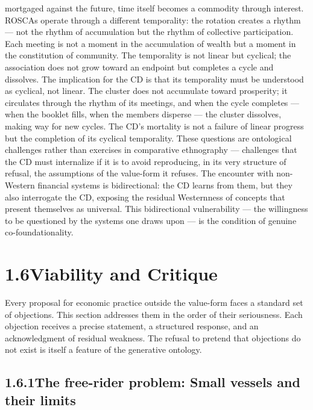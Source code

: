 mortgaged against the future, time itself becomes a commodity through interest. ROSCAs operate through a different temporality: the rotation creates a rhythm — not the rhythm of accumulation but the rhythm of collective participation. Each meeting is not a moment in the accumulation of wealth but a moment in the constitution of community. The temporality is not linear but cyclical; the association does not grow toward an endpoint but completes a cycle and dissolves. The implication for the CD is that its temporality must be understood as cyclical, not linear. The cluster does not accumulate toward prosperity; it circulates through the rhythm of its meetings, and when the cycle completes — when the booklet fills, when the members disperse — the cluster dissolves, making way for new cycles. The CD’s mortality is not a failure of linear progress but the completion of its cyclical temporality. These questions are ontological challenges rather than exercises in comparative ethnography — challenges that the CD must internalize if it is to avoid reproducing, in its very structure of refusal, the assumptions of the value-form it refuses. The encounter with non-Western financial systems is bidirectional: the CD learns from them, but they also interrogate the CD, exposing the residual Westernness of concepts that present themselves as universal. This bidirectional vulnerability — the willingness to be questioned by the systems one draws upon — is the condition of genuine co-foundationality.

\section{1.6\quad Viability and Critique}

Every proposal for economic practice outside the value-form faces a standard set of objections. This section addresses them in the order of their seriousness. Each objection receives a precise statement, a structured response, and an acknowledgment of residual weakness. The refusal to pretend that objections do not exist is itself a feature of the generative ontology.

\subsection{1.6.1\quad The free-rider problem: Small vessels and their limits}


